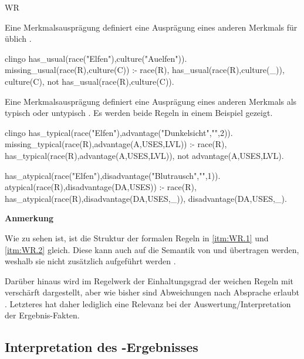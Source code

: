 \begin{enumerateWithCode}{WR}
    \item\label{itm:WR.1} Eine Merkmalsausprägung definiert eine Ausprägung eines anderen Merkmals für üblich \parencites(\vgl)()[][Schritt 4 und 6]{RWiki-Erstellung}{RWiki-Spezies-Elfen}.
    \begin{mintedNameless}{clingo}
has_usual(race("Elfen"),culture("Auelfen")).
missing_usual(race(R),culture(C)) :- race(R), has_usual(race(R),culture(_)), culture(C),           not has_usual(race(R),culture(C)).
    \end{mintedNameless}

    \item\label{itm:WR.2} Eine Merkmalsausprägung definiert eine Ausprägung eines anderen Merkmals als typisch oder untypisch .
    Es werden beide Regeln in einem Beispiel gezeigt.
    \begin{mintedNameless}{clingo}
has_typical(race("Elfen"),advantage("Dunkelsicht","",2)).
missing_typical(race(R),advantage(A,USES,LVL)) :- race(R), has_typical(race(R),advantage(A,USES,LVL)), not advantage(A,USES,LVL).

has_atypical(race("Elfen"),disadvantage("Blutrausch","",1)).
atypical(race(R),disadvantage(DA,USES)) :- race(R), has_atypical(race(R),disadvantage(DA,USES,_)), disadvantage(DA,USES,_).
    \end{mintedNameless}
\end{enumerateWithCode}

\textbf{Anmerkung}

Wie zu sehen ist, ist die Struktur der formalen Regeln in \ref{itm:WR.1} und \ref{itm:WR.2} gleich.
Diese kann auch auf die Semantik von  und  übertragen werden, weshalb sie nicht zusätzlich aufgeführt werden .

Darüber hinaus wird im Regelwerk der Einhaltungsgrad der weichen Regeln mit  verschärft dargestellt, aber wie bisher sind Abweichungen nach Absprache erlaubt .
Letzteres hat daher lediglich eine Relevanz bei der Auswertung/Interpretation der Ergebnis-Fakten.


\subsection{Interpretation des -Ergebnisses}\label{subsec:interpretation-des-asp-ergebnisses}

